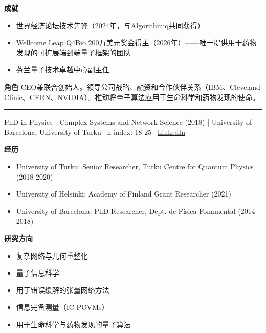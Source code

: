 \par{\footnotesize\color{mainred}\textbf{成就}}
\begin{itemize}[leftmargin=1.2em,itemsep=0pt,topsep=0pt]
\item {\footnotesize 世界经济论坛技术先锋（2024年，与Algorithmiq共同获得）}
\item {\footnotesize Wellcome Leap Q4Bio 200万美元奖金得主（2026年）——唯一提供用于药物发现的可扩展端到端量子框架的团队}
\item {\footnotesize 芬兰量子技术卓越中心副主任}
\end{itemize}
\par{\footnotesize\color{mainred}\textbf{角色}} {\footnotesize CEO兼联合创始人。领导公司战略、融资和合作伙伴关系（IBM、Cleveland Clinic、CERN、NVIDIA）。推动将量子算法应用于生命科学和药物发现的使命。}
\vspace{2pt}\hrule\vspace{2pt}
\vspace{4pt}
\par{\footnotesize\color{graytext}PhD in Physics - Complex Systems and Network Science (2018) | University of Barcelona, University of Turku \textbar\  h-index: 18-25 \textbar\  \href{https://www.linkedin.com/in/guillermo-garc%C3%ADa-p%C3%A9rez-157143b9/}{LinkedIn}}
\par{\footnotesize\color{mainred}\textbf{经历}}
\begin{itemize}[leftmargin=1.2em,itemsep=0pt,topsep=0pt]
\item {\footnotesize University of Turku: Senior Researcher, Turku Centre for Quantum Physics (2018-2020)}
\item {\footnotesize University of Helsinki: Academy of Finland Grant Researcher (2021)}
\item {\footnotesize University of Barcelona: PhD Researcher, Dept. de Física Fonamental (2014-2018)}
\end{itemize}
\par{\footnotesize\color{mainred}\textbf{研究方向}}
\begin{itemize}[leftmargin=1.2em,itemsep=0pt,topsep=0pt]
\item {\footnotesize 复杂网络与几何重整化}
\item {\footnotesize 量子信息科学}
\item {\footnotesize 用于错误缓解的张量网络方法}
\item {\footnotesize 信息完备测量（IC-POVMs）}
\item {\footnotesize 用于生命科学与药物发现的量子算法}
\end{itemize}
